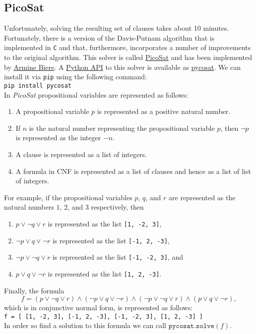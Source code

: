 \pagebreak

\hspace*{\fill}
\pagebreak

\subsection{PicoSat}
Unfortunately, solving the resulting set of clauses takes about 10 minutes.  Fortunately, there is a version
of the Davis-Putnam algorithm that is implemented in \texttt{C} and that, furthermore, incorporates a number of
improvements to the original algorithm.  This solver is called \href{https://fmv.jku.at/picosat/}{PicoSat}
and has been implemented by \href{https://cca.informatik.uni-freiburg.de/biere/}{Armine Biere}.
A \href{https://github.com/conda/pycosat}{Python API} to this solver is available as
\href{https://pypi.org/project/pycosat/}{pycosat}.  We can install it via \texttt{pip} using the following command:
\\[0.2cm]
\hspace*{1.3cm}
\texttt{pip install pycosat}
\\[0.2cm]
In \textsl{PicoSat} propositional variables are represented as follows:
\begin{enumerate}
\item A propositional variable $p$ is represented as a positive natural number.
\item If $n$ is the natural number representing the propositional variable $p$, then $\neg p$ is represented as
      the integer $-n$. 
\item A clause is represented as a list of integers.
\item A formula in CNF is represented as a list of clauses and hence as a list of list of integers.
\end{enumerate}
For example, if the propositional variables $p$, $q$, and $r$ are represented as the natural numbers
$1$, $2$, and $3$ respectively, then
\begin{enumerate}
\item $p \vee \neg q \vee r$ is represented as the list \texttt{[1, -2, 3]},
\item $\neg p \vee q \vee \neg r$ is represented as the list \texttt{[-1, 2, -3]},
\item $\neg p \vee \neg q \vee r$ is represented as the list \texttt{[-1, -2, 3]}, and
\item $p \vee q \vee \neg r$ is represented as the list \texttt{[1, 2, -3]}.
\end{enumerate}
Finally, the formula 
$$ f = (p \vee \neg q \vee r) \wedge (\neg p \vee q \vee \neg r) \wedge (\neg p \vee \neg q \vee r) \wedge (p \vee q \vee \neg r), $$
which is in conjunctive normal form, is represented as follows:
\\[0.2cm]
\hspace*{1.3cm}
\texttt{f = [ [1, -2, 3], [-1, 2, -3], [-1, -2, 3], [1, 2, -3] ]}
\\[0.2cm]
In order so find a solution to this formula we can call $\texttt{pycosat.solve}(f)$.

